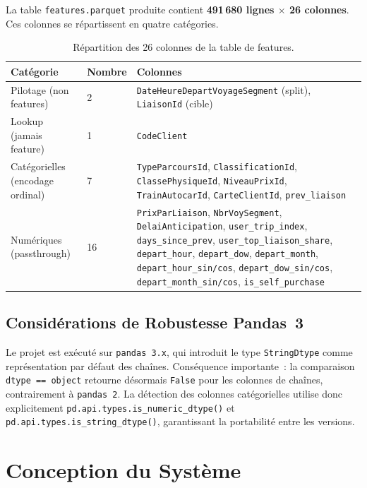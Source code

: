 \documentclass[11pt, a4paper]{article}
\begin{document}
La table \texttt{features.parquet} produite contient
\textbf{491\,680 lignes $\times$ 26 colonnes}. Ces colonnes se
répartissent en quatre catégories.

\begin{table}[h]
\centering
\small
\begin{tabularx}{\textwidth}{|l|l|X|}
\hline
\textbf{Catégorie} & \textbf{Nombre} & \textbf{Colonnes} \\
\hline
Pilotage (non features)   & 2  &
  \texttt{DateHeureDepartVoyageSegment} (split),
  \texttt{LiaisonId} (cible) \\
\hline
Lookup (jamais feature)   & 1  &
  \texttt{CodeClient} \\
\hline
Catégorielles (encodage ordinal) & 7  &
  \texttt{TypeParcoursId}, \texttt{ClassificationId},
  \texttt{ClassePhysiqueId}, \texttt{NiveauPrixId},
  \texttt{TrainAutocarId}, \texttt{CarteClientId},
  \texttt{prev\_liaison} \\
\hline
Numériques (passthrough)  & 16 &
  \texttt{PrixParLiaison}, \texttt{NbrVoySegment},
  \texttt{DelaiAnticipation}, \texttt{user\_trip\_index},
  \texttt{days\_since\_prev}, \texttt{user\_top\_liaison\_share},
  \texttt{depart\_hour}, \texttt{depart\_dow}, \texttt{depart\_month},
  \texttt{depart\_hour\_sin/cos}, \texttt{depart\_dow\_sin/cos},
  \texttt{depart\_month\_sin/cos}, \texttt{is\_self\_purchase} \\
\hline
\end{tabularx}
\caption{Répartition des 26 colonnes de la table de features.}
\end{table}

\subsection{Considérations de Robustesse Pandas~3}

Le projet est exécuté sur \texttt{pandas~3.x}, qui introduit le type
\texttt{StringDtype} comme représentation par défaut des chaînes.
Conséquence importante~: la comparaison \texttt{dtype == object} retourne
désormais \texttt{False} pour les colonnes de chaînes, contrairement à
\texttt{pandas~2}. La détection des colonnes catégorielles utilise donc
explicitement \texttt{pd.api.types.is\_numeric\_dtype()} et
\texttt{pd.api.types.is\_string\_dtype()}, garantissant la portabilité
entre les versions.

\newpage
\section{Conception du Système}
\end{document}
